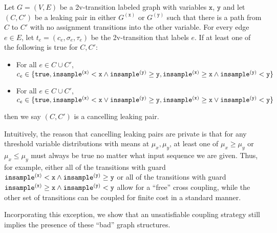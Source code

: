 \begin{defn}
    Let $G = (V, E)$ be a 2v-transition labeled graph with variables $\texttt{x}$, $\texttt{y}$ and let $(C, C')$ be a leaking pair in either $G^{(\texttt{x})}$ or $G^{(\texttt{y})}$ such that there is a path from $C$ to $C'$ with no assignment transitions into the other variable. For every edge $e\in E$, let $t_e = (c_e, \sigma_e, \tau_e)$ be the 2v-transition that labels $e$. 
    If at least one of the following is true for $C, C'$: \begin{itemize}
        \item For all $e\in C\cup C'$, $c_e \in \{\texttt{true}, \mvlguard[\texttt{x}]\land\mvgguard[\texttt{y}], \mvgguard[\texttt{x}]\land\mvlguard[\texttt{y}]\}$
        \item For all $e\in C\cup C'$, $c_e \in \{\texttt{true}, \mvlguard[\texttt{x}]\lor\mvgguard[\texttt{y}], \mvgguard[\texttt{x}]\lor\mvlguard[\texttt{y}]\}$
\end{itemize}
then we say $(C, C')$ is a cancelling leaking pair. 
\end{defn}

Intuitively, the reason that cancelling leaking pairs are private is that for any threshold variable distributions with means at $\mu_x,\mu_y$, at least one of $\mu_x\geq\mu_y$ or $\mu_x\leq \mu_y$ must always be true no matter what input sequence we are given. 
Thus, for example, either all of the transitions with guard $\mvlguard[\texttt{x}]\land\mvgguard[\texttt{y}]$ or all of the transitions with guard $\mvgguard[\texttt{x}]\land\mvlguard[\texttt{y}]$ allow for a ``free'' cross coupling, while the other set of transitions can be coupled for finite cost in a standard manner.

Incorporating this exception, we show that an unsatisfiable coupling strategy still implies the presence of these ``bad'' graph structures. 

